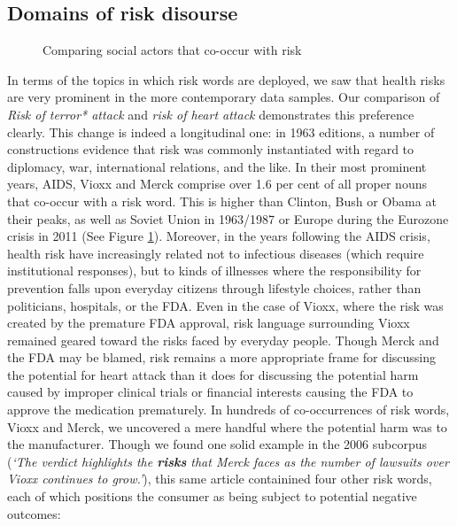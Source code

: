     \subsection{Domains of risk disourse}

           \begin{figure}[htb!]
            \centering
            \caption{Comparing social actors that co-occur with risk}
            \label{fig:comparison}
            \end{figure}

        In terms of the topics in which risk words are deployed, we saw that health risks are very prominent in the more contemporary data samples. Our comparison of \emph{Risk of terror* attack} and \emph{risk of heart attack} demonstrates this preference clearly. This change is indeed a longitudinal one: in 1963 editions, a number of constructions evidence that risk was commonly instantiated with regard to diplomacy, war, international relations, and the like. In their most prominent years, AIDS, Vioxx and Merck comprise over 1.6 per cent of all proper nouns that co-occur with a risk word. This is higher than Clinton, Bush or Obama at their peaks, as well as Soviet Union in 1963\slash 1987 or Europe during the Eurozone crisis in 2011 (See Figure \ref{fig:comparison}). Moreover, in the years following the AIDS crisis, health risk have increasingly related not to infectious diseases (which require institutional responses), but to kinds of illnesses where the responsibility for prevention falls upon everyday citizens through lifestyle choices, rather than politicians, hospitals, or the FDA. Even in the case of Vioxx, where the risk was created by the premature FDA approval, risk language surrounding Vioxx remained geared toward the risks faced by everyday people. Though Merck and the FDA may be blamed, risk remains a more appropriate frame for discussing the potential for heart attack than it does for discussing the potential harm caused by improper clinical trials or financial interests causing the FDA to approve the medication prematurely. In hundreds of co-occurrences of risk words, Vioxx and Merck, we uncovered a mere handful where the potential harm was to the manufacturer. Though we found one solid example in the 2006 subcorpus (\emph{`The verdict highlights the \textbf{risks} that Merck faces as the number of lawsuits over Vioxx continues to grow.'}), this same article containined four other risk words, each of which positions the consumer as being subject to potential negative outcomes:

